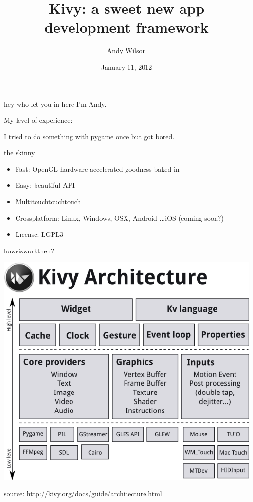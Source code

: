 \documentclass{beamer}
\title[Kivy]{Kivy: a sweet new app development framework}
\author[Andy Wilson]{Andy Wilson}
\date[January 2012]{January 11, 2012}
\begin{document}
\begin{frame}[plain]
  \titlepage
\end{frame}


\begin{frame}{hey who let you in here}
I'm Andy.

My level of experience:

I tried to do something with pygame once but got bored.

\end{frame}


\begin{frame}{the skinny}

\begin{itemize}
  \item Fast: OpenGL hardware accelerated goodness baked in
  \pause
  \item Easy: beautiful API
  \pause
  \item Multitouchtouchtouch
  \pause
  \item Crossplatform: Linux, Windows, OSX, Android
  \pause
  ...iOS (coming soon?)
  \pause
  \item License: LGPL3
\end{itemize}

\end{frame}


\begin{frame}{howsisworkthen?}
\begin{center}
  \includegraphics[height=.75\textheight]{architecture.png}
\end{center}

source: http://kivy.org/docs/guide/architecture.html

\end{frame}
\end{document}
